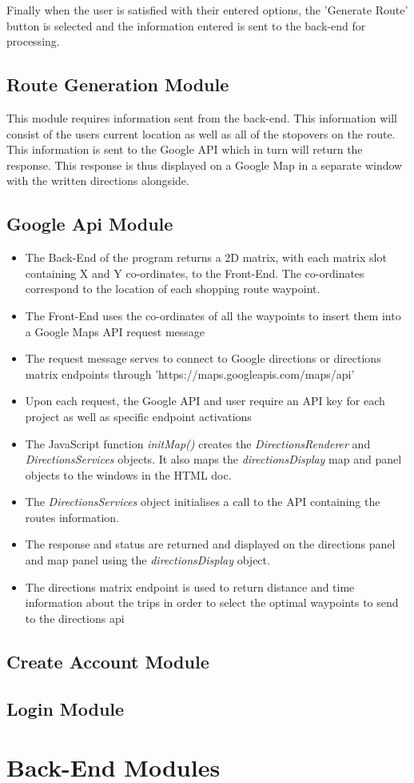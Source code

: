 \documentclass[10pt, a4paper, twocolumn]{scrartcl}
\begin{document}
		Finally when the user is satisfied with their entered options, the 'Generate Route' button is selected and the information entered is sent to the back-end for processing.
		
		\subsection{Route Generation Module}
		
		This module requires information sent from the back-end. This information will consist of the users current location as well as all of the stopovers on the route. This information is sent to the Google API which in turn will return the response. This response is thus displayed on a Google Map in a separate window with the written directions alongside.
		
		\subsection{Google Api Module}
		
				\begin{itemize}
					\item The Back-End of the program returns a 2D matrix, with each matrix slot containing X and Y co-ordinates, to the Front-End. The co-ordinates correspond to the location of each shopping route waypoint. 
					\item The Front-End uses the co-ordinates of all the waypoints to insert them into a Google Maps API request message
					\item The request message serves to connect to Google directions or directions matrix endpoints through 'https://maps.googleapis.com/maps/api'
					\item Upon each request, the Google API and user require an API key for each project as well as specific endpoint activations
					\item The JavaScript function \textit{initMap()} creates the \textit{DirectionsRenderer} and \textit{DirectionsServices} objects. It also maps the \textit{directionsDisplay} map and panel objects to the windows in the HTML doc.
					\item The \textit{DirectionsServices} object initialises a call to the API containing the routes information.
					\item The response and status are returned and displayed on the directions panel and map panel using the \textit{directionsDisplay} object.
					\item The directions matrix endpoint is used to return distance and time information about the trips in order to select the optimal waypoints to send to the directions api
				\end{itemize}
				
		
		\subsection{Create Account Module}
		
		\subsection{Login Module}
	
	\section{Back-End Modules}
		 
\end{document}
